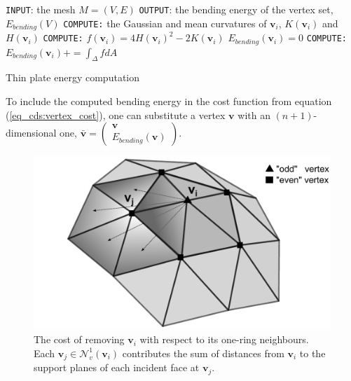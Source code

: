 \documentclass[graybox]{svmult}
\begin{document}
	\begin{algorithm}[t]
		\begin{algorithmic}
			\STATE \texttt{INPUT}: the mesh $M=(V,E)$
			\STATE \texttt{OUTPUT}: the bending energy of the vertex set, $E_{bending}(V)$
			\STATE \texttt{COMPUTE:} the Gaussian and mean curvatures of $\mathbf{v}_i$,
			$K(\mathbf{{v}}_i)$ and $H(\mathbf{{v}}_i)$
			\STATE \texttt{COMPUTE:} $f(\mathbf{v}_i) = 4H(\mathbf{{v}}_i)^2 - 2K(\mathbf{{v}}_i)$ 
			\ENDFOR
			\STATE $E_{bending}(\mathbf{{v}}_i) = 0$
			\STATE \texttt{COMPUTE:} $E_{bending}(\mathbf{v}_i) += \int_{\Delta }{f}dA$
			\ENDFOR
			\ENDFOR
		\end{algorithmic}
		\caption{Thin plate energy computation}
		\label{alg_cds:thin_plate_energy}
	\end{algorithm}
	To include the computed bending energy in the cost function from equation (\ref{eq_cds:vertex_cost}), one can substitute a vertex $\mathbf{v}$ with an $(n+1)$-dimensional one, $\mathbf{\bar{v}}=\begin{pmatrix}\mathbf{v} \\ E_{bending}(\mathbf{v})\end{pmatrix}$.
	
	\begin{figure}[t]
		\centering
		\includegraphics[width=.9\linewidth]{oneRingCost.pdf}
		\caption{\label{fig_cds:oneRingCost}
			The cost of removing $\mathbf{v}_i$ with respect to its one-ring neighbours. Each $\mathbf{v}_j \in \mathcal{N}_v^1(\mathbf{v}_i)$ contributes
			the sum of distances from $\mathbf{v}_i$ to the support planes of each incident face at $\mathbf{v}_j$.}
	\end{figure}
	
\end{document}
